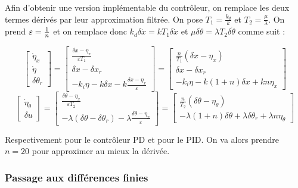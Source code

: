 \documentclass[10pt]{article}
\begin{document}
\noindent Afin d'obtenir une version implémentable du contrôleur, on remplace les deux termes dérivés par
leur approximation filtrée. On pose $T_1 =\frac{k_d}{k}$ et $T_2 = \frac{\mu}{\lambda}$. On prend $\varepsilon = \frac{1}{n}$
et on remplace donc $k_d \delta \dot x = k T_1 \delta \dot x$ et
$\mu \delta \dot \theta = \lambda T_2 \delta \dot \theta$ comme suit :

\[
	\begin{bmatrix}
		\dot \eta_x \\
		\dot \eta \\
		\delta \theta_r
	\end{bmatrix}
	= \begin{bmatrix}
		\frac{\delta x - \eta_x}{\varepsilon T_1} \\
		\delta x - \delta x_r \\
		- k_i \eta - k \delta x - k \frac{\delta x - \eta_x}{\varepsilon}
	\end{bmatrix}
	= \begin{bmatrix}
		\frac{n}{T_1} ( \delta x - \eta_x ) \\
		\delta x - \delta x_r \\
		- k_i \eta - k (1 + n) \delta x + k n \eta_x
	\end{bmatrix}
\]
\[
	\begin{bmatrix}
		\dot \eta_\theta \\
		\delta u
	\end{bmatrix}
	= \begin{bmatrix}
		\frac{\delta \theta - \eta_x}{\varepsilon T_2} \\
		- \lambda ( \delta \theta - \delta \theta_r ) - \lambda \frac{\delta \theta - \eta_x}{\varepsilon}
	\end{bmatrix}
	= \begin{bmatrix}
		\frac{n}{T_2} ( \delta \theta - \eta_\theta ) \\
		- \lambda ( 1 + n ) \delta \theta + \lambda \delta \theta_r + \lambda n \eta_\theta
	\end{bmatrix}
\]

\vspace{10px}

\noindent Respectivement pour le contrôleur PD et pour le PID. On va alors prendre $n = 20$ pour approximer au mieux
la dérivée. 

\subsubsection*{Passage aux différences finies}
\end{document}
